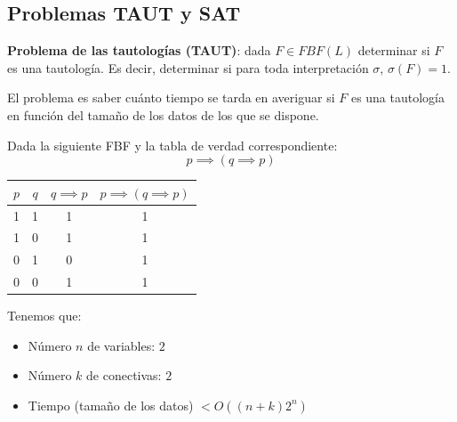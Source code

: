 \subsection{Problemas TAUT y SAT}
\begin{mdframed}
	\textbf{Problema de las tautologías (TAUT)}: dada $F\in FBF(L)$ determinar si $F$ es una tautología. Es decir, determinar si para toda interpretación $\sigma$, $\sigma (F)=1$.
\end{mdframed}

El problema es saber cuánto tiempo se tarda en averiguar si $F$ es una tautología en función del tamaño de los datos de los que se dispone.
\begin{example}
	Dada la siguiente FBF y la tabla de verdad correspondiente:
	$$p\implies(q\implies p)$$
	\begin{center}
		\begin{tabular}{|c|c|c|c|}
			\hline
			$p$ & $q$ & $q\implies p$ & $p\implies (q\implies p)$\\
			\hline
			1 & 1 & 1 & 1 \\
			\hline
			1 & 0 & 1 & 1 \\
			\hline
			0 & 1 & 0 & 1 \\
			\hline
			0 & 0 & 1 & 1 \\
			\hline
		\end{tabular}
	\end{center}
	Tenemos que:
		\begin{itemize}
			\item Número $n$ de variables: $2$
			\item Número $k$ de conectivas: $2$
			\item Tiempo (tamaño de los datos) $< O((n+k)2^n)$
		\end{itemize}
\end{example}

